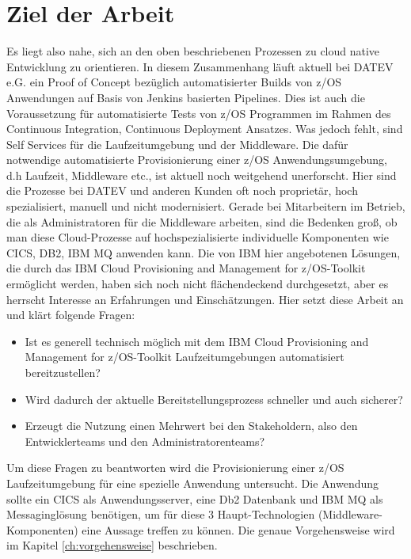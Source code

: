 \section{Ziel der Arbeit}\label{sec:ziel}
Es liegt also nahe, sich an den oben beschriebenen Prozessen zu cloud native Entwicklung zu orientieren. 
In diesem Zusammenhang läuft aktuell  bei DATEV e.G. ein Proof of Concept bezüglich automatisierter Builds von z/OS Anwendungen auf Basis von Jenkins basierten Pipelines. 
Dies ist auch die Voraussetzung für automatisierte Tests von z/OS Programmen im Rahmen des \glqq Continuous Integration, Continuous Deployment\grqq{} Ansatzes.
Was jedoch fehlt, sind \glqq Self Services\grqq{} für die Laufzeitumgebung und der Middleware.
Die dafür notwendige automatisierte Provisionierung einer z/OS Anwendungsumgebung, d.h Laufzeit, Middleware etc., ist aktuell noch weitgehend unerforscht. 
Hier sind die Prozesse bei DATEV und anderen Kunden oft noch proprietär, hoch spezialisiert,  manuell und nicht modernisiert. 
Gerade bei Mitarbeitern im Betrieb, die als Administratoren für die Middleware arbeiten, sind die Bedenken groß, ob man diese Cloud-Prozesse auf hochspezialisierte individuelle Komponenten wie CICS, DB2, IBM MQ anwenden kann.
Die von IBM hier angebotenen Lösungen, die durch das \glqq IBM Cloud Provisioning and Management for z/OS\grqq-Toolkit ermöglicht werden, haben sich noch nicht flächendeckend durchgesetzt, aber es herrscht Interesse an Erfahrungen und Einschätzungen.
Hier setzt diese Arbeit an und klärt folgende Fragen:

\begin{samepage}
\begin{itemize}
\item Ist es generell technisch möglich mit dem \glqq IBM Cloud Provisioning and Management for z/OS\grqq-Toolkit Laufzeitumgebungen automatisiert bereitzustellen?
\item Wird dadurch der aktuelle Bereitstellungsprozess schneller und auch sicherer?
\item Erzeugt die Nutzung einen Mehrwert bei den Stakeholdern, also den Entwicklerteams und den Administratorenteams?
\end{itemize}
\end{samepage}

Um diese Fragen zu beantworten wird die Provisionierung einer z/OS Laufzeitumgebung für eine spezielle Anwendung untersucht.
Die Anwendung sollte ein CICS als Anwendungsserver, eine Db2 Datenbank und IBM MQ als Messaginglösung benötigen, um für diese 3 Haupt-Technologien (Middleware-Komponenten) eine Aussage treffen zu können.
Die genaue Vorgehensweise wird im Kapitel \ref{ch:vorgehensweise} beschrieben.
